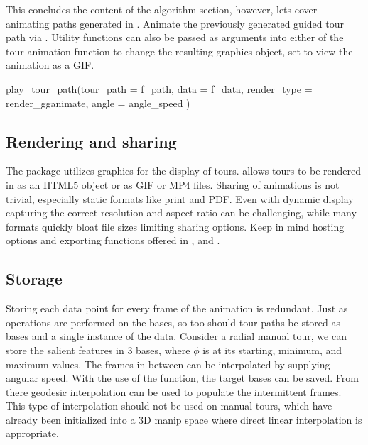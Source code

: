 This concludes the content of the algorithm section, however, lets cover
animating paths generated in . Animate the previously
generated guided tour path via . Utility
functions can also be passed as arguments into either of the tour
animation function to change the resulting graphics object, set
 to view the animation as a GIF.

\begin{Schunk}
\begin{Sinput}
play_tour_path(tour_path = f_path,
               data = f_data,
               render_type = render_gganimate, 
               angle = angle_speed
)
\end{Sinput}
\end{Schunk}

\hypertarget{rendering-and-sharing}{%
\subsection{Rendering and sharing}\label{rendering-and-sharing}}

The  package utilizes  graphics for the display of
tours.  allows tours to be rendered in  as an
HTML5 object or  as GIF or MP4 files. Sharing of
animations is not trivial, especially static formats like print and PDF.
Even with dynamic display capturing the correct resolution and aspect
ratio can be challenging, while many formats quickly bloat file sizes
limiting sharing options. Keep in mind hosting options and exporting
functions offered in ,  and .

\hypertarget{storage}{%
\subsection{Storage}\label{storage}}

Storing each data point for every frame of the animation is redundant.
Just as operations are performed on the bases, so too should tour paths
be stored as bases and a single instance of the data. Consider a radial
manual tour, we can store the salient features in 3 bases, where
\(\phi\) is at its starting, minimum, and maximum values. The frames in
between can be interpolated by supplying angular speed. With the use of
the  function, the target bases can be
saved. From there geodesic interpolation can be used to populate the
intermittent frames. This type of interpolation should not be used on
manual tours, which have already been initialized into a 3D manip space
where direct linear interpolation is appropriate.

